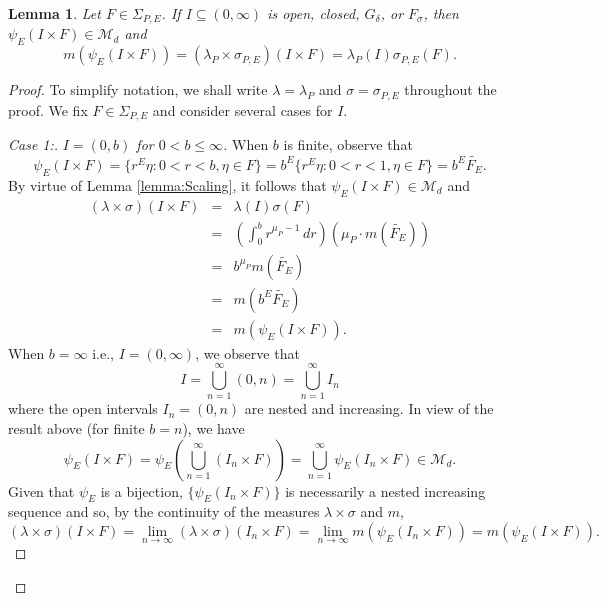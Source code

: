 \documentclass[11pt, letter]{book}
\newtheorem{lemma}[theorem]{Lemma}
\newcommand*{\myproofname}{Proof}
\newenvironment{subproof}[1][\myproofname]{\begin{proof}[#1]\renewcommand*{\qedsymbol}{$\mathbin{/\mkern-6mu/}$}}{\end{proof}}
\begin{document}
\begin{framed}
\begin{lemma}\label{lem:SpecialRectangle}
Let $F\in\Sigma_{P,E}$. If $I\subseteq (0,\infty)$ is open, closed, $G_\delta$, or $F_\sigma$, then $\psi_E(I\times F)\in\mathcal{M}_d$ and
\begin{equation}\label{eq:SpecialRectangle}
m(\psi_E(I\times F))=(\lambda_P\times\sigma_{P,E})(I\times F)=\lambda_P(I)\sigma_{P,E}(F).
\end{equation}
\end{lemma}
\end{framed}
\begin{proof}
To simplify notation, we shall write $\lambda=\lambda_P$ and $\sigma=\sigma_{P,E}$ throughout the proof. We fix $F\in\Sigma_{P,E}$ and consider several cases for $I$.

\begin{subproof}[Case 1:]\textit{$I=(0,b)$ for $0<b\leq \infty$.} When $b$ is finite, observe that
\begin{equation*}
\psi_E(I\times F)=\{r^E\eta:0<r<b,\eta\in F\}=b^E\{r^E\eta:0<r<1,\eta \in F\}=b^E\widetilde{F_E}.
\end{equation*}
By virtue of Lemma \ref{lemma:Scaling}, it follows that $\psi_E(I\times F)\in\mathcal{M}_d$ and
\begin{eqnarray*}
(\lambda\times\sigma)(I\times F)&=&\lambda(I)\sigma(F)\\
&=&\left(\int_0^b r^{\mu_P-1}\,dr\right)\left(\mu_P\cdot m(\widetilde{F_E})\right)\\
&=&b^{\mu_P}m(\widetilde{F_E})\\
&=&m(b^{E}\widetilde{F_E})\\
&=&m(\psi_E(I\times F)).
\end{eqnarray*}
When $b=\infty$ i.e., $I=(0,\infty)$, we observe that
\begin{equation*}
I=\bigcup_{n=1}^\infty (0,n)=\bigcup_{n=1}^\infty I_n
\end{equation*}
where the open intervals $I_n=(0,n)$ are nested and increasing. In view of the result above (for finite $b=n$), we have
\begin{equation*}\psi_E(I\times F)=\psi_E\left(\bigcup_{n=1}^\infty (I_n\times F)\right)=\bigcup_{n=1}^\infty\psi_E(I_n\times F)\in\mathcal{M}_d.
\end{equation*}
Given that $\psi_E$ is a bijection, $\{\psi_E(I_n\times F)\}$ is necessarily a nested increasing sequence and so, by the continuity of the measures $\lambda\times\sigma$ and $m$,
\begin{equation*}
(\lambda\times\sigma)(I\times F)=\lim_{n\to\infty}(\lambda\times\sigma)(I_n\times F)=\lim_{n\to\infty}m(\psi_E(I_n\times F))= m(\psi_E(I\times F)). 
\end{equation*}
\end{subproof}


\end{proof}
\end{document}
